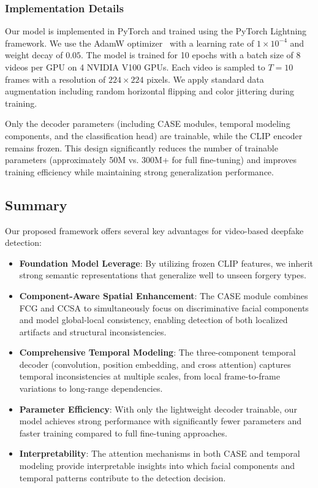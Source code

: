 \subsubsection{Implementation Details}

Our model is implemented in PyTorch and trained using the PyTorch Lightning framework. We use the AdamW optimizer~\cite{loshchilov2017decoupled} with a learning rate of $1 \times 10^{-4}$ and weight decay of $0.05$. The model is trained for 10 epochs with a batch size of 8 videos per GPU on 4 NVIDIA V100 GPUs. Each video is sampled to $T=10$ frames with a resolution of $224 \times 224$ pixels. We apply standard data augmentation including random horizontal flipping and color jittering during training.

Only the decoder parameters (including CASE modules, temporal modeling components, and the classification head) are trainable, while the CLIP encoder remains frozen. This design significantly reduces the number of trainable parameters (approximately 50M vs. 300M+ for full fine-tuning) and improves training efficiency while maintaining strong generalization performance.

\subsection{Summary}

Our proposed framework offers several key advantages for video-based deepfake detection:

\begin{itemize}
\item \textbf{Foundation Model Leverage}: By utilizing frozen CLIP features, we inherit strong semantic representations that generalize well to unseen forgery types.

\item \textbf{Component-Aware Spatial Enhancement}: The CASE module combines FCG and CCSA to simultaneously focus on discriminative facial components and model global-local consistency, enabling detection of both localized artifacts and structural inconsistencies.

\item \textbf{Comprehensive Temporal Modeling}: The three-component temporal decoder (convolution, position embedding, and cross attention) captures temporal inconsistencies at multiple scales, from local frame-to-frame variations to long-range dependencies.

\item \textbf{Parameter Efficiency}: With only the lightweight decoder trainable, our model achieves strong performance with significantly fewer parameters and faster training compared to full fine-tuning approaches.

\item \textbf{Interpretability}: The attention mechanisms in both CASE and temporal modeling provide interpretable insights into which facial components and temporal patterns contribute to the detection decision.
\end{itemize}
